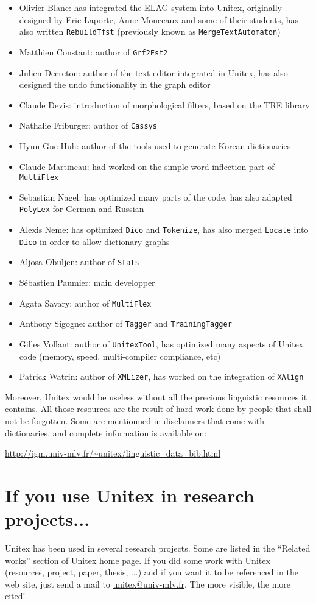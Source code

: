 \begin{itemize}
    \item Olivier Blanc: has integrated the ELAG system into Unitex, originally
    designed by Eric Laporte, Anne Monceaux and some of their students, has
    also written \verb+RebuildTfst+ (previously known as \verb+MergeTextAutomaton+)
    \item Matthieu Constant: author of \verb+Grf2Fst2+
    \item Julien Decreton: author of the text editor integrated in Unitex,
    has also designed the undo functionality in the graph editor
    \item Claude Devis: introduction of morphological filters, 
    based on the TRE library
    \item Nathalie Friburger: author of \verb+Cassys+
    \item Hyun-Gue Huh: author of the tools used to
    generate Korean dictionaries
    \item Claude Martineau: had worked on the simple word inflection part of
    \verb+MultiFlex+
    \item Sebastian Nagel: has optimized many parts of the code, has also
    adapted \verb+PolyLex+ for German and Russian
    \item Alexis Neme: has optimized \verb+Dico+ and \verb+Tokenize+, has also
    merged \verb+Locate+ into \verb+Dico+ in order to allow dictionary graphs 
    \item Aljosa Obuljen: author of \verb+Stats+
    \item S\'ebastien Paumier: main developper
    \item Agata Savary: author of \verb+MultiFlex+
    \item Anthony Sigogne: author of \verb+Tagger+ and \verb+TrainingTagger+
    \item Gilles Vollant: author of \verb+UnitexTool+, has optimized many
    aspects of Unitex code (memory, speed, multi-compiler compliance, etc)
    \item Patrick Watrin: author of \verb+XMLizer+, has worked on the
    integration of \verb+XAlign+
\end{itemize}

\bigskip
\noindent Moreover, Unitex would be useless without all the precious linguistic
resources it contains. All those resources are the result of hard work done
by people that shall not be forgotten. Some are mentionned in disclaimers that
come with dictionaries, and complete information is available on:

\bigskip
\noindent \url{http://igm.univ-mlv.fr/~unitex/linguistic_data_bib.html}


\section*{If you use Unitex in research projects...}
Unitex has been used in several research projects. Some are listed in the
``Related works'' section of Unitex home page. If you did some work with Unitex
(resources, project, paper, thesis, ...) and if you want it to be referenced in
the web site, just send a mail to \url{unitex@univ-mlv.fr}. The more visible,
the more cited!
